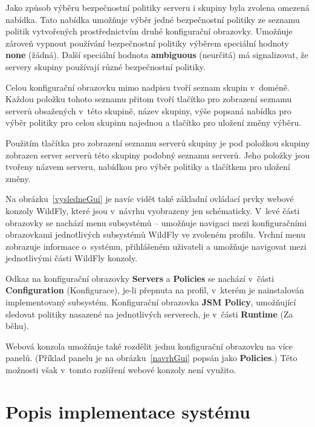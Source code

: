 Jako způsob výběru bezpečnostní politiky serveru i skupiny byla zvolena omezená nabídka. Tato nabídka umožňuje výběr jedné bezpečnostní politiky ze seznamu politik vytvořených prostřednictvím druhé konfigurační obrazovky. Umožňuje zároveň vypnout používání bezpečnostní politiky výběrem speciální hodnoty {\bf none} (žádná). Další speciální hodnota {\bf ambiguous} (neurčitá) má signalizovat, že servery skupiny používají různé bezpečnostní politiky.

Celou konfigurační obrazovku mimo nadpisu tvoří seznam skupin v~doméně. Každou položku tohoto seznamu přitom tvoří tlačítko pro zobrazení seznamu serverů obsažených v~této skupině, název skupiny, výše popsaná nabídka pro výběr politiky pro celou skupinu najednou a tlačítko pro uložení změny výběru.

Použitím tlačítka pro zobrazení seznamu serverů skupiny je pod položkou skupiny zobrazen server serverů této skupiny podobný seznamu serverů. Jeho položky jsou tvořeny názvem serveru, nabídkou pro výběr politiky a tlačítkem pro uložení změny.

Na obrázku~\ref{vysledneGui} je navíc vidět také základní ovládací prvky webové konzoly WildFly, které jsou v~návrhu vyobrazeny jen schématicky.
V~levé části obrazovky se nachází menu subsystémů -- umožňuje navigaci mezi konfiguračními obrazovkami jednotlivých subsystémů WildFly ve zvoleném profilu.
Vrchní menu zobrazuje informace o~systému, přihlášeném uživateli a umožňuje navigovat mezi jednotlivými části WildFly konzoly.

Odkaz na konfigurační obrazovky {\bf Servers} a {\bf Policies} se nachází v~části {\bf Configuration} (Konfigurace), je-li přepnuta na profil, v~kterém je nainstalován implementovaný subsystém. Konfigurační obrazovka {\bf JSM Policy}, umožňující sledovat politiky nasazené na jednotlivých serverech, je v~části {\bf Runtime} (Za běhu).

Webová konzola umožňuje také rozdělit jednu konfigurační obrazovku na více panelů. (Příklad panelu je na obrázku~\ref{navrhGui} popsán jako {\bf Policies}.)
Této možnosti však v~tomto rozšíření webové konzoly není využito.

\chapter{Popis implementace systému} \label{implementace}

